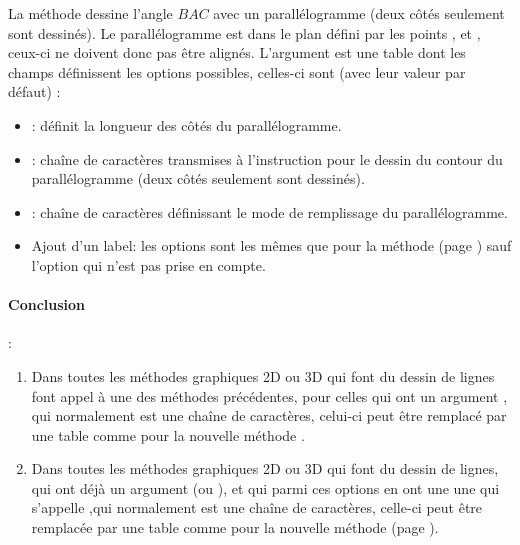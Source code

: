 La méthode  dessine l'angle \(BAC\) avec un parallélogramme (deux côtés seulement sont dessinés). Le parallélogramme est dans le plan défini par les points ,  et , ceux-ci ne doivent donc pas être alignés. L'argument est une table dont les champs définissent les options possibles, celles-ci sont (avec leur valeur par défaut) :
\begin{itemize}
    \item {} : définit la longueur des côtés du parallélogramme.
    
    \item {} : chaîne de caractères transmises à l'instruction \drawcmd pour le dessin du contour du parallélogramme (deux côtés seulement sont dessinés).
    
    \item {} : chaîne de caractères définissant le mode de remplissage du parallélogramme.
    
    \item Ajout d'un label: les options sont les mêmes que pour la méthode  (page \pageref{dec:dpolyline}) sauf l'option  qui n'est pas prise en compte.
\end{itemize}

\paragraph{Conclusion} : 
\begin{enumerate}
    \item Dans toutes les méthodes graphiques 2D ou 3D qui font du dessin de lignes font appel à une des méthodes précédentes, pour celles qui ont un argument , qui normalement est une chaîne de caractères, celui-ci peut être remplacé par une table  comme pour la nouvelle méthode .
    
    \item Dans toutes les méthodes graphiques 2D ou 3D qui font du dessin de lignes, qui ont déjà un argument  (ou  ), et qui parmi ces options en ont une une qui s'appelle  ,qui normalement est une chaîne de caractères, celle-ci peut être remplacée par une table  comme pour la nouvelle méthode  (page \pageref{dec:dpolyline}).
\end{enumerate}

